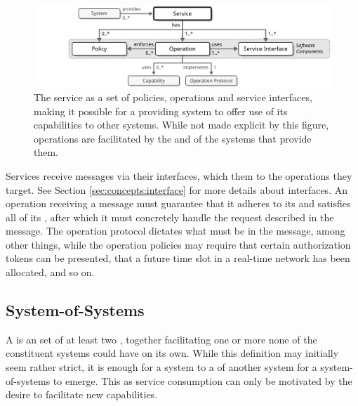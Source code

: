 \begin{figure}[ht!]
  \centering
  \includegraphics[scale=0.9]{figures/service}
  \caption{
    The service as a set of policies, operations and service interfaces, making it possible for a providing system to offer use of its capabilities to other systems.
    While not made explicit by this figure, operations are facilitated by the  and  of the systems that provide them.
  }
  \label{fig:service}
\end{figure}

Services receive messages via their interfaces, which  them to the operations they target.
See Section \ref{sec:concepts:interface} for more details about interfaces.
An operation receiving a message must guarantee that it adheres to its  and satisfies all of its , after which it must concretely handle the request described in the message.
The operation protocol dictates what  must be in the message, among other things, while the operation policies may require that certain authorization tokens can be presented, that a future time slot in a real-time network has been allocated, and so on.

\subsection{System-of-Systems}
\label{sec:concepts:sos}

A  is an  set of at least two , together facilitating one or more  none of the constituent systems could have on its own.
While this definition may initially seem rather strict, it is enough for a system to  a  of another system for a system-of-systems to emerge.
This as service consumption can only be motivated by the desire to facilitate new capabilities.


